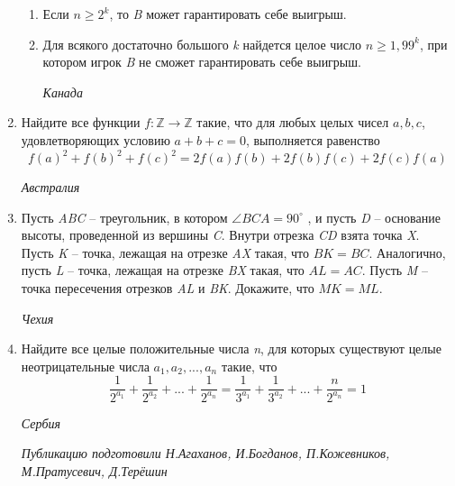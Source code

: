 \documentclass[a4paper,12pt]{article}
\begin{document}
\begin{multicols}{2}
\begin{enumerate}
        \begin{enumerate}
            \item Если $n \geq 2^k$, то \textit{B} может гарантировать себе выигрыш.
            \item Для всякого достаточно большого \textit{k} найдется целое число $n \geq 1,99^k$, при котором игрок \textit{B} не сможет гарантировать себе выигрыш. \par\hfill \textit{Канада}
        \end{enumerate}
        \item Найдите все функции $f: \mathbb{Z} \to \mathbb{Z}$ такие, что для любых целых чисел $a, b, c$, удовлетворяющих условию $a + b + c = 0$, выполняется равенство
            \begin{equation*}
                f(a)^2+f(b)^2+f(c)^2=2f(a)f(b)+2f(b)f(c)+2f(c)f(a)
            \end{equation*}
            \par\hfill \textit{Австралия}
        \item Пусть \textit{ABC} – треугольник, в котором $\angle BCA = 90^\circ$ , и пусть \textit{D} – основание высоты, проведенной из вершины \textit{C}. Внутри отрезка \textit{CD} взята точка \textit{X}. Пусть \textit{K} – точка, лежащая на отрезке \textit{AX} такая, что $BK = BC$. Аналогично, пусть \textit{L} – точка, лежащая на отрезке \textit{BX} такая, что $AL = AC$. Пусть \textit{M} – точка пересечения отрезков \textit{AL} и \textit{BK}. Докажите, что $MK = ML$.\par\hfill \textit{Чехия}
        \item Найдите все целые положительные числа \textit{n}, для которых существуют целые неотрицательные числа $a_1, a_2, ..., a_n$ такие, что
            \begin{equation*}
                \frac{1}{2^{a_1}} + \frac{1}{2^{a_2}} + ... + \frac{1}{2^{a_n}} = \frac{1}{3^{a_1}} + \frac{1}{3^{a_2}} + ... + \frac{n}{2^{a_n}} = 1
            \end{equation*}
            \par\hfill \textit{Сербия}
            \par\raggedleft \textit{Публикацию подготовили Н.Агаханов, И.Богданов, П.Кожевников, М.Пратусевич, Д.Терёшин}
    \end{enumerate}
    \end{multicols}
\end{document}
